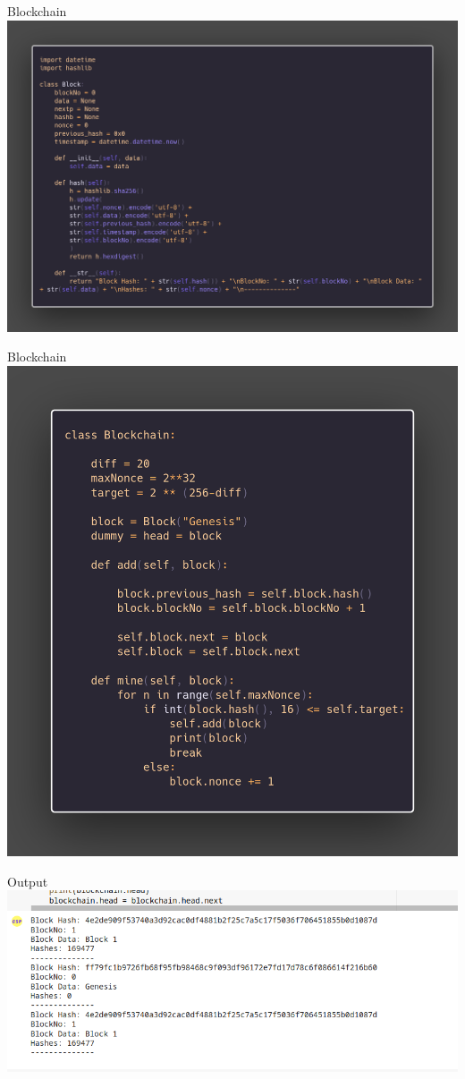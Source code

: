 \documentclass{beamer}
\begin{document}
	\begin{frame}{Blockchain}
	\includegraphics[scale=.17]{carbon.png}    
	\end{frame}
	\begin{frame}{Blockchain}
	\includegraphics[scale=.17]{2block.png}
	\end{frame}

	\begin{frame}{Output}
		\includegraphics[scale=.8]{out.png}
	\end{frame}
\end{document}
